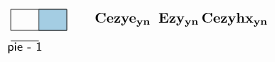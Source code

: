 \documentclass[10pt]{article}
\begin{document}
\[\begin{tikzpicture}
%
\node[draw=black,minimum width=4em,minimum height=1.5em,rectangle]  at (0,0) {};
\node[draw=black,fill=nblue!40,minimum width=2em,minimum height=1.5em,rectangle]  at (1em,0em) {}; %
%
\node[]  at (6em,0) {${\bf Cezye_{yn}}$};
\node[]  at (10em,0) {${\bf Ezy_{yn}}$};
\node[]  at (14em,0) {${\bf Cezyhx_{yn}}$};
%
\draw[] (-2em,-1.5em) -- (0em,-1.5em);
\node[]  at (-1em,-2em) {\small{\sf pie - 1}};
%
\end{tikzpicture}
\]
\end{document}
